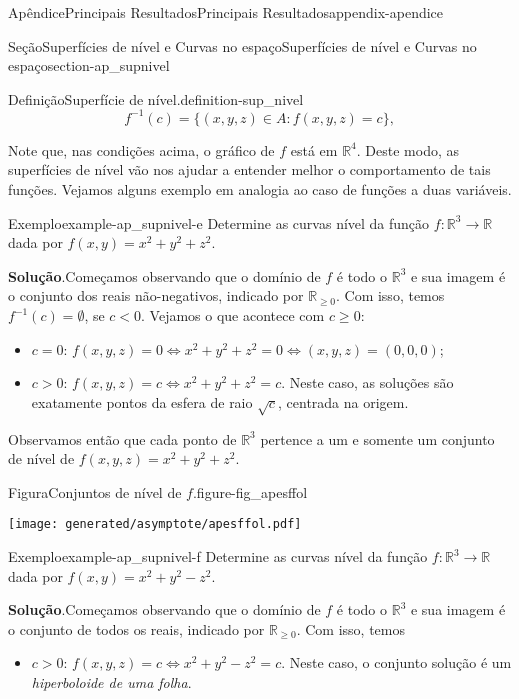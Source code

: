 \documentclass[oneside,10pt,]{book}
\newcommand{\blocktitlefont}{\relax}
\numberwithin{equation}{section}
\newcommand{\R}{\mathbb R}
\begin{document}
\begin{appendixptx}{Apêndice}{Principais Resultados}{}{Principais Resultados}{}{}{appendix-apendice}
\begin{sectionptx}{Seção}{Superfícies de nível e Curvas no espaço}{}{Superfícies de nível e Curvas no espaço}{}{}{section-ap_supnivel}
\begin{definition}{Definição}{Superfície de nível.}{definition-sup_nivel}
\begin{equation*}
f^{-1}(c)=\{(x,y,z)\in A\colon f(x,y,z)=c\},
\end{equation*}
\end{definition}
Note que, nas condições acima, o gráfico de \(f\) está em \(\R^4\). Deste modo, as superfícies de nível vão nos ajudar a entender melhor o comportamento de tais funções. Vejamos alguns exemplo em analogia ao caso de funções a duas variáveis.%
\begin{example}{Exemplo}{}{example-ap_supnivel-e}%
Determine as curvas nível da função \(f\colon\R^3\to\R\) dada por \(f(x,y)=x^2+y^2+z^2\).%
\par\smallskip%
\noindent\textbf{\blocktitlefont Solução}.\hypertarget{solution-ap_supnivel-e-b}{}\quad{}Começamos observando que o domínio de \(f\) é todo o \(\R^3\) e sua imagem é o conjunto dos reais não-negativos, indicado por \(\R_{\geq 0}\). Com isso, temos \(f^{-1}(c)=\emptyset\), se \(c< 0\). Vejamos o que acontece com \(c\geq0\):%
\begin{itemize}[label=\textbullet]
\item{}\(c=0\): \(f(x,y,z)=0\iff x^2+y^2+z^2=0\iff
(x,y,z)=(0,0,0)\);%
\item{}\(c>0\): \(f(x,y,z)=c\iff x^2+y^2+z^2=c\). Neste caso, as soluções são exatamente pontos da esfera de raio \(\sqrt{c}\), centrada na origem.%
\end{itemize}
Observamos então que cada ponto de \(\R^3\) pertence a um e somente um conjunto de nível de \(f(x,y,z)=x^2+y^2+z^2\). \begin{figureptx}{Figura}{Conjuntos de nível de \(f\).}{figure-fig_apesffol}{}%
\begin{image}{0.25}{0.5}{0.25}{}%
\texttt{[image: generated/asymptote/apesffol.pdf]}
\end{image}%
\tcblower
\end{figureptx}%
%
\end{example}
\begin{example}{Exemplo}{}{example-ap_supnivel-f}%
Determine as curvas nível da função \(f\colon\R^3\to\R\) dada por \(f(x,y)=x^2+y^2-z^2\).%
\par\smallskip%
\noindent\textbf{\blocktitlefont Solução}.\hypertarget{solution-ap_supnivel-f-b}{}\quad{}Começamos observando que o domínio de \(f\) é todo o \(\R^3\) e sua imagem é o conjunto de todos os reais, indicado por \(\R_{\geq 0}\). Com isso, temos%
\begin{itemize}[label=\textbullet]
\item{}\(c> 0\): \(f(x,y,z)=c \iff
x^2+y^2-z^2=c\). Neste caso, o conjunto solução é um \emph{hiperboloide de uma folha}.%

\end{itemize}
\end{example}
\end{sectionptx}
\end{appendixptx}
\end{document}
